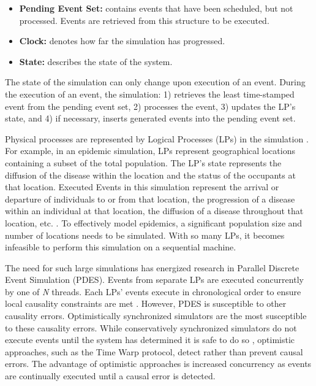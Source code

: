 \documentclass[11pt]{book}
\begin{document}
\begin{itemize}
  \item\textbf{Pending Event Set:} contains events that have been scheduled, but not
    processed.  Events are retrieved from this structure to be executed.
  \item\textbf{Clock:} denotes how far the simulation has progressed.
  \item\textbf{State:} describes the state of the system.
\end{itemize}

\noindent
The state of the simulation can only change upon execution of an event.  During the
execution of an event, the simulation: 1) retrieves the least time-stamped event from the
pending event set, 2) processes the event, 3) updates the LP's state, and 4) if
necessary, inserts generated events into the pending event set.

Physical processes are represented by Logical Processes (LPs) in the simulation
\cite{des_misra}.  For example, in an epidemic simulation, LPs represent
geographical locations containing a subset of the total population.  The LP's
state represents the diffusion of the disease within the location and the status
of the occupants at that location.  Executed Events in this simulation represent
the arrival or departure of individuals to or from that location, the
progression of a disease within an individual at that location, the diffusion of
a disease throughout that location, etc. \cite{epidemic}. To effectively model
epidemics, a significant population size and number of locations needs to be
simulated.  With so many LPs, it becomes infeasible to perform this simulation
on a sequential machine.  

The need for such large simulations has energized research in Parallel Discrete
Event Simulation (PDES).  Events from separate LPs are executed concurrently by
one of \emph{N} threads.  Each LPs' events execute in chronological order to
ensure local causality constraints are met \cite{fujimoto}.  However, PDES is
susceptible to other causality errors.  Optimistically synchronized simulators
are the most susceptible to these causality errors.  While conservatively synchronized
simulators do not execute events until the system has determined it is safe to
do so \cite{fujimoto}, optimistic approaches, such as the Time Warp protocol,
detect rather than prevent causal errors. The advantage of optimistic approaches
is increased concurrency as events are continually executed until a causal error
is detected. 
\end{document}
